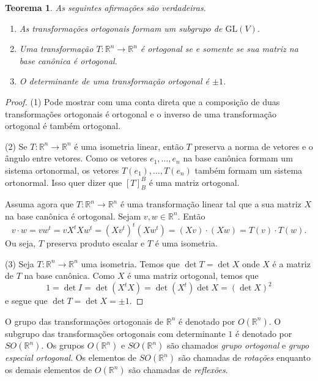 \documentclass[12pt]{amsart}
\newcommand{\R}{\mathbb R}
\newcommand{\glv}[1]{\mbox{GL}(#1)}
\newtheorem{theorem}{Teorema}
\theoremstyle{definition}
\begin{document}
\begin{theorem}
    As seguintes afirmações são verdadeiras.
    \begin{enumerate}
        \item As transformações ortogonais formam um subgrupo de $\glv V$.
        \item Uma transformação $T:\R^n\to \R^n$ é ortogonal se e somente se sua matriz na base 
        canônica é ortogonal.
        \item O determinante de uma transformação ortogonal é $\pm 1$.  
    \end{enumerate}
\end{theorem}
\begin{proof}
    (1) Pode mostrar com uma conta direta que a composição de duas transformações ortogonais é ortogonal 
    e o inverso de uma transformação ortogonal é também ortogonal.

    (2) Se $T:\R^n\to \R^n$ é uma isometria linear, então $T$ preserva a norma de vetores e o ângulo entre vetores.
    Como os vetores $e_1,\ldots,e_n$ na base canônica formam um sistema ortonormal, 
    os vetores $T(e_1),\ldots,T(e_n)$ também formam um sistema ortonormal. Isso quer dizer que 
    $[T]_B^B$ é uma matriz ortogonal.
    
    Assuma agora que $T:\R^n\to \R^n$ é uma transformação linear tal que a sua matriz 
    $X$ na base canônica é ortogonal. Sejam $v,w\in\R^n$. Então  
    \[
        v\cdot w=vw^t=vX^tXw^t=(Xv^t)^t(Xw^t)=(Xv)\cdot (Xw)=T(v)\cdot T(w).
    \]
    Ou seja, $T$ preserva produto escalar e $T$ é uma isometria. 

    (3) Seja $T:\R^n\to \R^n$ uma isometria. Temos que $\det T=\det X$ onde $X$ é a matriz de $T$ na 
    base canônica. Como $X$ é uma matriz ortogonal, temos que 
    \[
        1=\det I=\det(X^tX)=\det(X^t)\det X=(\det X)^2
    \]
    e segue que $\det T=\det X=\pm 1$. 
\end{proof}

O grupo das transformações ortogonais de $\R^n$ é denotado por $O(\R^n)$. O subgrupo das transformações 
ortogonais com determinante $1$ é denotado por $SO(\R^n)$. Os grupos $O(\R^n)$ e $SO(\R^n)$ são chamados 
\emph{grupo ortogonal} e \emph{grupo especial ortogonal}. Os elementos de $SO(\R^n)$ são chamadas 
de \emph{rotações}
enquanto os demais elementos de $O(\R^n)$ são chamadas de \emph{reflexões}.
\end{document}
